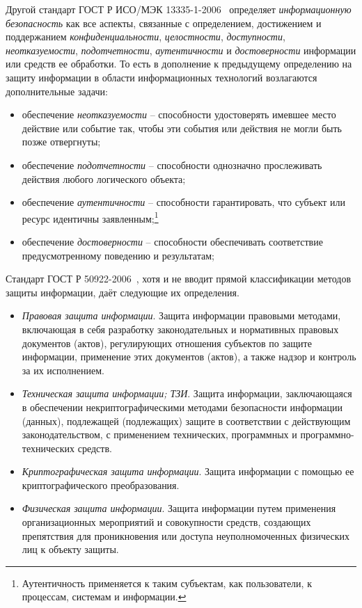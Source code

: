 Другой стандарт ГОСТ Р ИСО/МЭК 13335-1-2006~\cite{GOST-13335-1-2006} определяет \emph{информационную безопасность} как все аспекты, связанные с определением, достижением и поддержанием \emph{конфиденциальности}, \emph{целостности}, \emph{доступности}, \emph{неотказуемости}, \emph{подотчетности}, \emph{аутентичности} и \emph{достоверности} информации или средств ее обработки. То есть в дополнение к предыдущему определению на защиту информации в области информационных технологий возлагаются дополнительные задачи:
\begin{itemize}
	\item обеспечение \emph{неотказуемости} -- способности удостоверять имевшее место действие или событие так, чтобы эти события или действия не могли быть позже отвергнуты;
	\item обеспечение \emph{подотчетности} -- способности однозначно прослеживать действия любого логического объекта;
	\item обеспечение \emph{аутентичности} -- способности гарантировать, что субъект или ресурс идентичны заявленным;\footnote{Аутентичность применяется к таким субъектам, как пользователи, к процессам, системам и информации.}
	\item обеспечение \emph{достоверности} -- способности обеспечивать соответствие предусмотренному поведению и результатам;
\end{itemize}

Стандарт ГОСТ Р 50922-2006~\cite{GOST-50922-2006}, хотя и не вводит прямой классификации методов защиты информации, даёт следующие их определения.
\begin{itemize}
	\item \emph{Правовая защита информации}. Защита информации правовыми методами, включающая в себя разработку законодательных и нормативных правовых документов (актов), регулирующих отношения субъектов по защите информации, применение этих документов (актов), а также надзор и контроль за их исполнением.
	\item \emph{Техническая защита информации; ТЗИ}. Защита информации, заключающаяся в обеспечении некриптографическими методами безопасности информации (данных), подлежащей (подлежащих) защите в соответствии с действующим законодательством, с применением технических, программных и программно-технических средств.
	\item \emph{Криптографическая защита информации}. Защита информации с помощью ее криптографического преобразования.
	\item \emph{Физическая защита информации}. Защита информации путем применения организационных мероприятий и совокупности средств, создающих препятствия для проникновения или доступа неуполномоченных физических лиц к объекту защиты.
\end{itemize}

